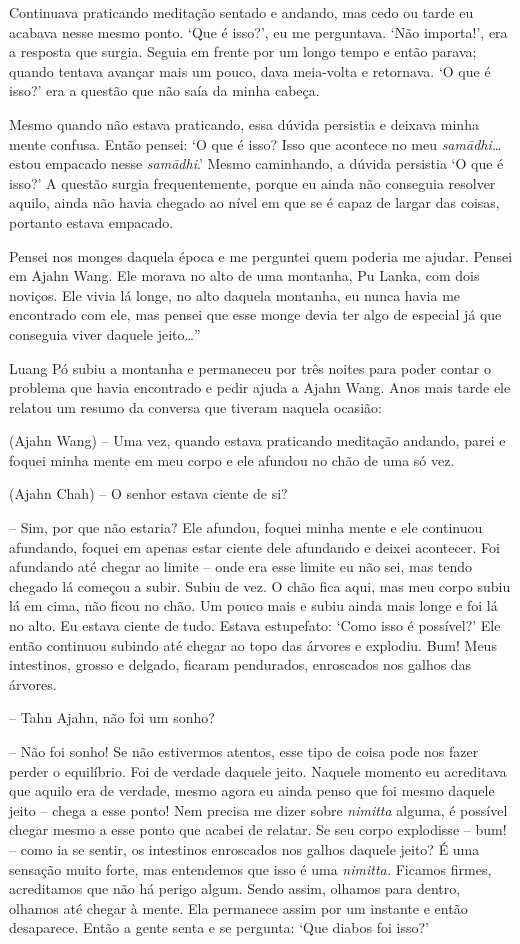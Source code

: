 Continuava praticando meditação sentado e andando, mas cedo ou tarde eu
acabava nesse mesmo ponto. `Que é isso?', eu me perguntava. `Não
importa!', era a resposta que surgia. Seguia em frente por um longo
tempo e então parava; quando tentava avançar mais um pouco, dava
meia-volta e retornava. `O que é isso?' era a questão que não saía da
minha cabeça.

Mesmo quando não estava praticando, essa dúvida persistia e deixava
minha mente confusa. Então pensei: `O que é isso? Isso que acontece no
meu \emph{samādhi\ldots{}} estou empacado nesse \emph{samādhi}.' Mesmo
caminhando, a dúvida persistia `O que é isso?' A questão surgia
frequentemente, porque eu ainda não conseguia resolver aquilo, ainda não
havia chegado ao nível em que se é capaz de largar das coisas, portanto
estava empacado.

Pensei nos monges daquela época e me perguntei quem poderia me ajudar.
Pensei em Ajahn Wang. Ele morava no alto de uma montanha, Pu Lanka, com
dois noviços. Ele vivia lá longe, no alto daquela montanha, eu nunca
havia me encontrado com ele, mas pensei que esse monge devia ter algo de
especial já que conseguia viver daquele jeito\ldots{}''

Luang Pó subiu a montanha e permaneceu por três noites para poder contar
o problema que havia encontrado e pedir ajuda a Ajahn Wang. Anos mais
tarde ele relatou um resumo da conversa que tiveram naquela ocasião:

(Ajahn Wang) -- Uma vez, quando estava praticando meditação andando,
parei e foquei minha mente em meu corpo e ele afundou no chão de uma só
vez.

(Ajahn Chah) -- O senhor estava ciente de si?

-- Sim, por que não estaria? Ele afundou, foquei minha mente e ele
continuou afundando, foquei em apenas estar ciente dele afundando e
deixei acontecer. Foi afundando até chegar ao limite -- onde era esse
limite eu não sei, mas tendo chegado lá começou a subir. Subiu de vez. O
chão fica aqui, mas meu corpo subiu lá em cima, não ficou no chão. Um
pouco mais e subiu ainda mais longe e foi lá no alto. Eu estava ciente
de tudo. Estava estupefato: `Como isso é possível?' Ele então continuou
subindo até chegar ao topo das árvores e explodiu. Bum! Meus intestinos,
grosso e delgado, ficaram pendurados, enroscados nos galhos das árvores.

-- Tahn Ajahn, não foi um sonho?

-- Não foi sonho! Se não estivermos atentos, esse tipo de coisa pode nos
fazer perder o equilíbrio. Foi de verdade daquele jeito. Naquele momento
eu acreditava que aquilo era de verdade, mesmo agora eu ainda penso que
foi mesmo daquele jeito -- chega a esse ponto! Nem precisa me dizer
sobre \emph{nimitta} alguma, é possível chegar mesmo a esse ponto que
acabei de relatar. Se seu corpo explodisse -- bum! -- como ia se sentir,
os intestinos enroscados nos galhos daquele jeito? É uma sensação muito
forte, mas entendemos que isso é uma \emph{nimitta.} Ficamos firmes,
acreditamos que não há perigo algum. Sendo assim, olhamos para dentro,
olhamos até chegar à mente. Ela permanece assim por um instante e então
desaparece. Então a gente senta e se pergunta: `Que diabos foi isso?'

